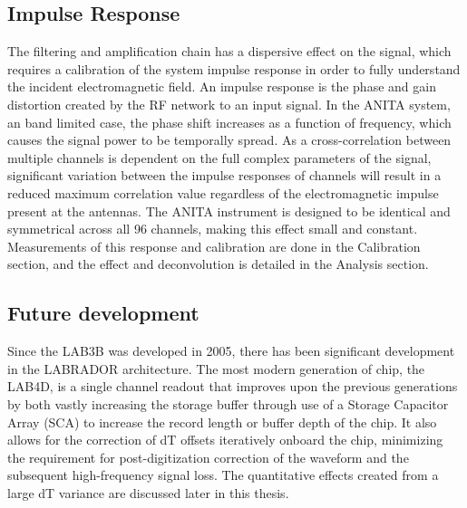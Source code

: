	\subsection{Impulse Response}
	The filtering and amplification chain has a dispersive effect on the signal, which requires a calibration of the system impulse response in order to fully understand the incident electromagnetic field.  An impulse response is the phase and gain distortion created by the RF network to an input signal.  In the ANITA system, an band limited case, the phase shift increases as a function of frequency, which causes the signal power to be temporally spread.  As a cross-correlation between multiple channels is dependent on the full complex parameters of the signal, significant variation between the impulse responses of channels will result in a reduced maximum correlation value regardless of the electromagnetic impulse present at the antennas.  The ANITA instrument is designed to be identical and symmetrical across all 96 channels, making this effect small and constant.  Measurements of this response and calibration are done in the Calibration section, and the effect and deconvolution is detailed in the Analysis section.

	
	\subsection{Future development}
	Since the LAB3B was developed in 2005, there has been significant development in the LABRADOR architecture.  The most modern generation of chip, the LAB4D, is a single channel readout that improves upon the previous generations by both vastly increasing the storage buffer through use of a Storage Capacitor Array (SCA) to increase the record length or buffer depth of the chip.  It also allows for the correction of dT offsets iteratively onboard the chip, minimizing the requirement for post-digitization correction of the waveform and the subsequent high-frequency signal loss.  The quantitative effects created from a large dT variance are discussed later in this thesis.
	
		
